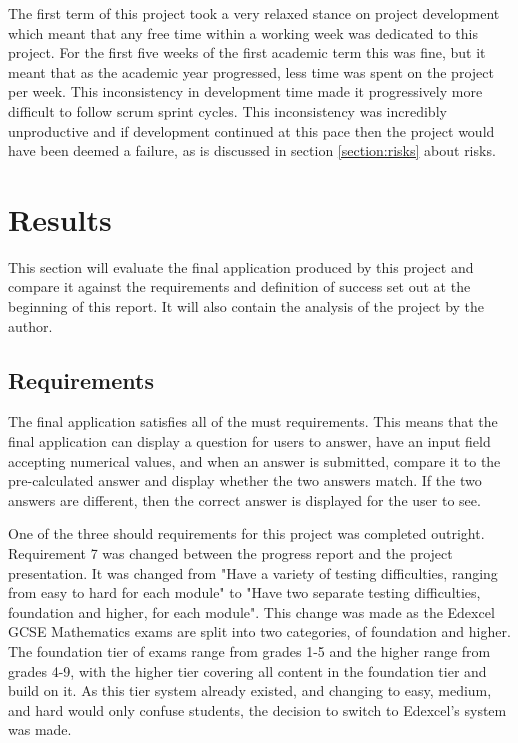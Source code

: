 \documentclass{article}
\begin{document}
The first term of this project took a very relaxed stance on project development which meant that any free time within a working week was dedicated to this project. For the first five weeks of the first academic term this was fine, but it meant that as the academic year progressed, less time was spent on the project per week. This inconsistency in development time made it progressively more difficult to follow scrum sprint cycles. This inconsistency was incredibly unproductive and if development continued at this pace then the project would have been deemed a failure, as is discussed in section \ref{section:risks} about risks. \par

\section{Results}
\label{section:results}

This section will evaluate the final application produced by this project and compare it against the requirements and definition of success set out at the beginning of this report. It will also contain the analysis of the project by the author. 

\subsection{Requirements}

The final application satisfies all of the must requirements. This means that the final application can display a question for users to answer, have an input field accepting numerical values, and when an answer is submitted, compare it to the pre-calculated answer and display whether the two answers match. If the two answers are different, then the correct answer is displayed for the user to see. \par

One of the three should requirements for this project was completed outright. Requirement 7 was changed between the progress report and the project presentation. It was changed from "Have a variety of testing difficulties, ranging from easy to hard for each module" to "Have two separate testing difficulties, foundation and higher, for each module". This change was made as the Edexcel GCSE Mathematics exams are split into two categories, of foundation and higher. The foundation tier of exams range from grades 1-5 and the higher range from grades 4-9, with the higher tier covering all content in the foundation tier and build on it. As this tier system already existed, and changing to easy, medium, and hard would only confuse students, the decision to switch to Edexcel's system was made. \par
\end{document}
